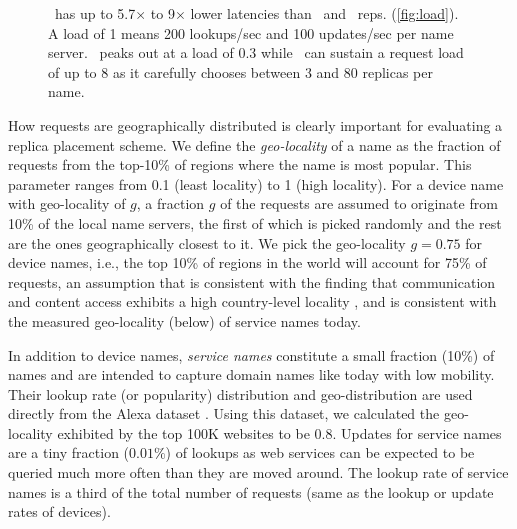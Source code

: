 \begin{figure}[t]
\vspace{-0.15in}
\caption{\small{\auspice\ has up to 5.7$\times$ to 9$\times$ lower latencies than \staticthree\ and \codons\ reps. (\ref{fig:load}). A load of 1 means 200 lookups/sec and 100 updates/sec per name server. \replicateall\ peaks out at a load of 0.3 while \auspice\ can sustain a request load of up to 8 as it carefully chooses between 3 and 80 replicas per name.}}
\vspace{-0.15in}
\label{fig:lookupupdate}
\end{figure}


How requests are geographically distributed is clearly important for evaluating a replica placement scheme.  We define the {\em geo-locality} of a name as the fraction of requests from the top-10\% of regions where the name is most popular. This parameter ranges from 0.1 (least locality) to 1 (high locality). For a device name with  geo-locality of $g$,  a fraction $g$ of the requests are assumed to originate from 10\% of the local name servers, the first of which is picked randomly and the rest are the ones geographically closest to it. We pick the geo-locality $g=0.75$ for device names, i.e., the top 10\% of regions in the world will account for 75\% of requests, an assumption that is consistent with the finding that communication and content access exhibits a high country-level locality \cite{twitter-www}, and is consistent with the measured geo-locality (below) of service names today.

In addition to device names, {\em service names} constitute a small fraction (10\%) of names and are intended to capture domain names like today with low mobility. Their lookup rate (or popularity) distribution and geo-distribution are used directly from the Alexa dataset \cite{alexa}. Using this dataset, we calculated the geo-locality exhibited by the top 100K websites to be 0.8. Updates for service names are a tiny fraction ($0.01\%$) of lookups as web services can be expected to be queried much more often than they are moved around. The lookup rate of service names is a third of the total number of requests (same as the lookup or update rates of devices).



